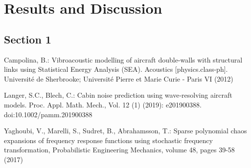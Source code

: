 \documentclass[%
  a4paper,oneside,%
  11pt,%
  smallchapters,
  green,%
  rgb, <cmyk>
  ,]{tubsbook}
\begin{document}
\chapter{Results and Discussion}

\lipsum[1-3] %

\section{Section 1}

\lipsum[4-7] %


\begin{thebibliography}{4}
%
Campolina, B.: Vibroacoustic modelling of aircraft double-walls with structural links using Statistical
Energy Analysis (SEA). Acoustics [physics.class-ph]. Université de Sherbrooke; Université Pierre
et Marie Curie - Paris VI (2012)

Langer, S.C., Blech, C.: Cabin noise prediction using wave‐resolving aircraft models. Proc. Appl. Math. Mech., Vol. 12 (1) (2019): e201900388. doi:10.1002/pamm.201900388

 Yaghoubi, V., Marelli, S., Sudret, B., Abrahamsson, T.: Sparse polynomial chaos expansions of frequency response functions using stochastic frequency transformation, Probabilistic Engineering Mechanics, volume 48, pages 39-58 (2017)
\end{thebibliography}
\end{document}
